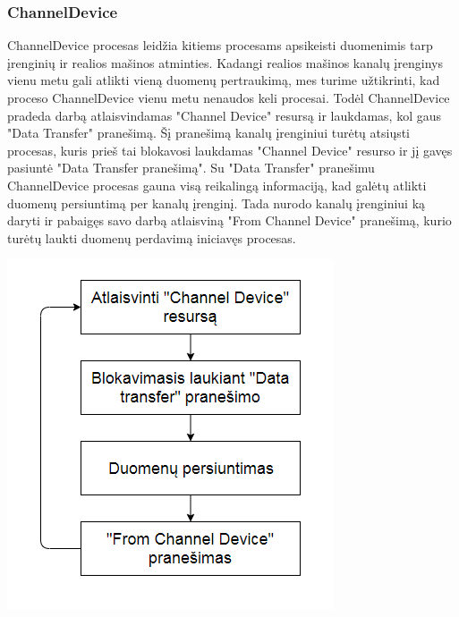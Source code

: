 \documentclass{scrartcl}
\begin{document}
      \subsubsection{ChannelDevice}
        ChannelDevice procesas leidžia kitiems procesams apsikeisti duomenimis tarp įrenginių ir realios mašinos atminties. Kadangi realios mašinos kanalų įrenginys vienu metu gali atlikti vieną duomenų pertraukimą, mes turime užtikrinti, kad proceso ChannelDevice vienu metu nenaudos keli procesai. Todėl ChannelDevice pradeda darbą atlaisvindamas "Channel Device" resursą ir laukdamas, kol gaus "Data Transfer" pranešimą. Šį pranešimą kanalų įrenginiui turėtų atsiųsti procesas, kuris prieš tai blokavosi laukdamas "Channel Device" resurso ir jį gavęs pasiuntė "Data Transfer pranešimą". Su "Data Transfer" pranešimu ChannelDevice procesas gauna visą reikalingą informaciją, kad galėtų atlikti duomenų persiuntimą per kanalų įrenginį. Tada nurodo kanalų įrenginiui ką daryti ir pabaigęs savo darbą atlaisviną "From Channel Device" pranešimą, kurio turėtų laukti duomenų perdavimą iniciavęs procesas.
        \begin{center}
          \includegraphics[scale=1]{ChannelDevice}
        \end{center}
\end{document}
